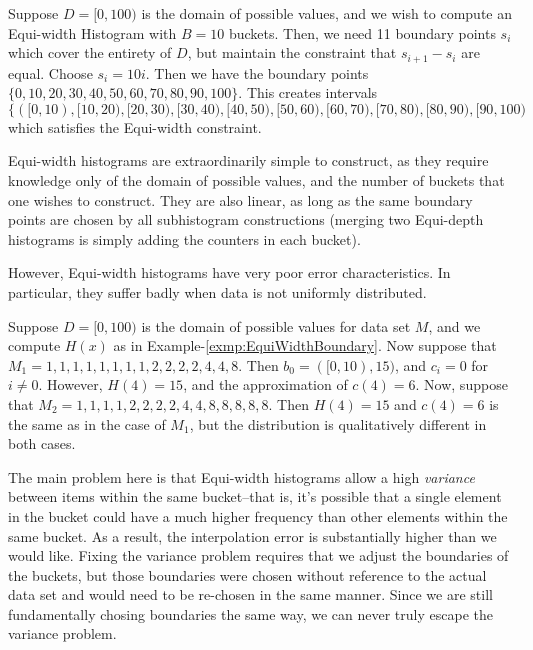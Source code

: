 \begin{exmp}
				\label{exmp:EquiWidthBoundary}
				Suppose $D = [0,100)$ is the domain of possible values, and we wish to compute an Equi-width Histogram with $B = 10$ buckets. Then, we need 11 boundary points $s_i$ which cover the entirety of $D$, but maintain the constraint that $s_{i+1}-s_i$ are equal. Choose $s_i = 10i$. Then we have the boundary points $\lbrace 0,10,20,30,40,50,60,70,80,90,100 \rbrace$. This creates intervals $\lbrace ([0,10),[10,20),[20,30),[30,40),[40,50),[50,60),[60,70),[70,80),[80,90),[90,100)$ which satisfies the Equi-width constraint.
\end{exmp}

Equi-width histograms are extraordinarily simple to construct, as they require knowledge only of the domain of possible values, and the number of buckets that one wishes to construct. They are also linear, as long as the same boundary points are chosen by all subhistogram constructions (merging two Equi-depth histograms is simply adding the counters in each bucket).

However, Equi-width histograms have very poor error characteristics\cite{PiatetskyTuple}. In particular, they suffer badly when data is not uniformly distributed.

\begin{exmp}
				\label{exmp:EquiWidthResolution}
				Suppose $D = [0,100)$ is the domain of possible values for data set $M$, and we compute $H(x)$ as in Example-\ref{exmp:EquiWidthBoundary}.
								Now suppose that $M_1 = {1,1,1,1,1,1,1,1,2,2,2,2,4,4,8}$. Then $b_0 = ([0,10),15)$, and $c_i = 0$ for $i \neq 0$. However, $H(4) = 15$, and the approximation of $c(4) = 6$. 
												Now, suppose that $M_2 = {1,1,1,1,2,2,2,2,4,4,8,8,8,8,8}$. Then $H(4) = 15$ and $c(4) = 6$ is the same as in the case of $M_1$, but the distribution is qualitatively different in both cases.
\end{exmp}

The main problem here is that Equi-width histograms allow a high \emph{variance} between items within the same bucket--that is, it's possible that a single element in the bucket could have a much higher frequency than other elements within the same bucket. As a result, the interpolation error is substantially higher than we would like. Fixing the variance problem requires that we adjust the boundaries of the buckets, but those boundaries were chosen without reference to the actual data set and would need to be re-chosen in the same manner. Since we are still fundamentally chosing boundaries the same way, we can never truly escape the variance problem.

